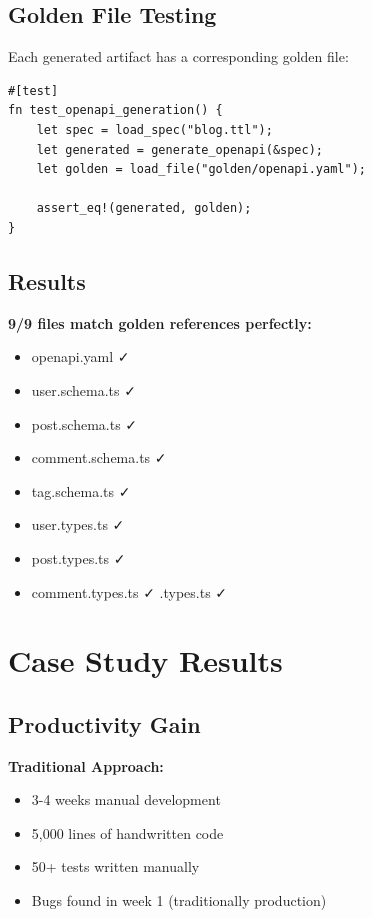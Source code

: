 \subsection{Golden File Testing}

Each generated artifact has a corresponding golden file:

\begin{verbatim}
#[test]
fn test_openapi_generation() {
    let spec = load_spec("blog.ttl");
    let generated = generate_openapi(&spec);
    let golden = load_file("golden/openapi.yaml");

    assert_eq!(generated, golden);
}
\end{verbatim}

\subsection{Results}

\textbf{9/9 files match golden references perfectly:}
\begin{itemize}
    \item openapi.yaml ✓
    \item user.schema.ts ✓
    \item post.schema.ts ✓
    \item comment.schema.ts ✓
    \item tag.schema.ts ✓
    \item user.types.ts ✓
    \item post.types.ts ✓
    \item comment.types.ts ✓
    \tag.types.ts ✓
\end{itemize}

\section{Case Study Results}

\subsection{Productivity Gain}

\textbf{Traditional Approach:}
\begin{itemize}
    \item 3-4 weeks manual development
    \item 5,000 lines of handwritten code
    \item 50+ tests written manually
    \item Bugs found in week 1 (traditionally production)
\end{itemize}


